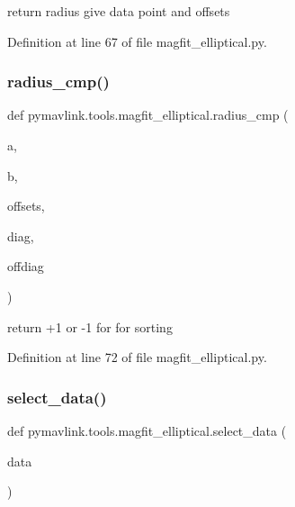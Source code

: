 \begin{DoxyVerb}return radius give data point and offsets\end{DoxyVerb}
 

Definition at line 67 of file magfit\+\_\+elliptical.\+py.

\mbox{\label{namespacepymavlink_1_1tools_1_1magfit__elliptical_a103d997042a9a3703cb39c2a9ae8cbf2}} 
\subsubsection{\texorpdfstring{radius\_cmp()}{radius\_cmp()}}
{\footnotesize\ttfamily def pymavlink.\+tools.\+magfit\+\_\+elliptical.\+radius\+\_\+cmp (\begin{DoxyParamCaption}\item[{}]{a,  }\item[{}]{b,  }\item[{}]{offsets,  }\item[{}]{diag,  }\item[{}]{offdiag }\end{DoxyParamCaption})}

\begin{DoxyVerb}return +1 or -1 for for sorting\end{DoxyVerb}
 

Definition at line 72 of file magfit\+\_\+elliptical.\+py.

\mbox{\label{namespacepymavlink_1_1tools_1_1magfit__elliptical_aee3a351a012aa1e67eb9de0407ef7830}} 
\subsubsection{\texorpdfstring{select\_data()}{select\_data()}}
{\footnotesize\ttfamily def pymavlink.\+tools.\+magfit\+\_\+elliptical.\+select\+\_\+data (\begin{DoxyParamCaption}\item[{}]{data }\end{DoxyParamCaption})}



